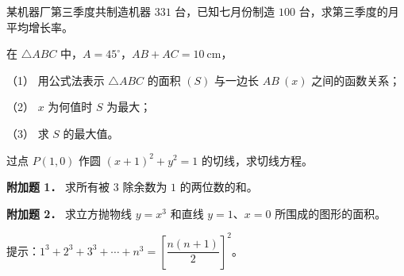 \begin{question}
某机器厂第三季度共制造机器 $331$ 台，已知七月份制造 $100$ 台，求第三季度的月平均增长率。

\end{question}
\begin{question}
在 $\triangle ABC$ 中，$A=45^\circ$，$AB+AC=10\ \mathrm{cm}$，

（1） 用公式法表示 $\triangle ABC$ 的面积 $(S)$ 与一边长 $AB\ (x)$ 之间的函数关系；

（2） $x$ 为何值时 $S$ 为最大；

（3） 求 $S$ 的最大值。

\end{question}
\begin{question}
过点 $P(1,0)$ 作圆 $(x+1)^2+y^2=1$ 的切线，求切线方程。

\textbf{附加题 1．} 求所有被 $3$ 除余数为 $1$ 的两位数的和。

\textbf{附加题 2．} 求立方抛物线 $y=x^3$ 和直线 $y=1$、$x=0$ 所围成的图形的面积。

\begin{gktip}
提示：$1^3+2^3+3^3+\cdots+n^3=\left[\dfrac{n(n+1)}{2}\right]^2$。
\end{gktip}

\end{question}